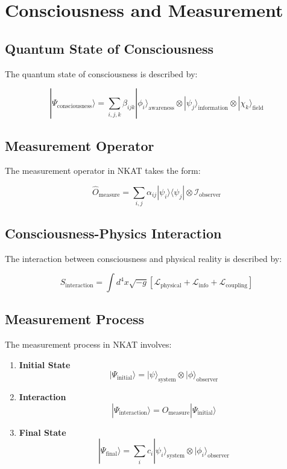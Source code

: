 \section{Consciousness and Measurement}

\subsection{Quantum State of Consciousness}

The quantum state of consciousness is described by:

\[
|\Psi_{\text{consciousness}}\rangle = \sum_{i,j,k} \beta_{ijk} |\phi_i\rangle_{\text{awareness}} \otimes |\psi_j\rangle_{\text{information}} \otimes |\chi_k\rangle_{\text{field}}
\]

\subsection{Measurement Operator}

The measurement operator in NKAT takes the form:

\[
\hat{O}_{\text{measure}} = \sum_{i,j} \alpha_{ij} |\psi_i\rangle\langle\psi_j| \otimes \mathcal{I}_{\text{observer}}
\]

\subsection{Consciousness-Physics Interaction}

The interaction between consciousness and physical reality is described by:

\[
S_{\text{interaction}} = \int d^4x \sqrt{-g} \left[\mathcal{L}_{\text{physical}} + \mathcal{L}_{\text{info}} + \mathcal{L}_{\text{coupling}}\right]
\]

\subsection{Measurement Process}

The measurement process in NKAT involves:

\begin{enumerate}
    \item \textbf{Initial State}
    \[
    |\Psi_{\text{initial}}\rangle = |\psi\rangle_{\text{system}} \otimes |\phi\rangle_{\text{observer}}
    \]
    
    \item \textbf{Interaction}
    \[
    |\Psi_{\text{interaction}}\rangle = \hat{O}_{\text{measure}} |\Psi_{\text{initial}}\rangle
    \]
    
    \item \textbf{Final State}
    \[
    |\Psi_{\text{final}}\rangle = \sum_i c_i |\psi_i\rangle_{\text{system}} \otimes |\phi_i\rangle_{\text{observer}}
    \]
\end{enumerate}

